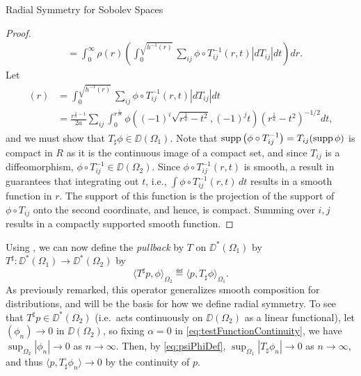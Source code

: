\begin{chapter}{Radial Symmetry for Sobolev Spaces}
\begin{proof}
\begin{align}
    &= \int_0^\infty \rho(r) \left(\int_0^{\sqrt{h^{-1}(r)}} \sum_{ij}\phi \circ T_{ij}^{-1}(r,t)\left|dT_{ij}\right|dt \right)dr \label{eq:phiEquation}.
  \end{align}
  Let 
  \begin{align}
    [T_\sharp\phi](r) 
      &= \int_0^{\sqrt{h^{-1}(r)}} \sum_{ij}\phi \circ T_{ij}^{-1}(r,t)\left|dT_{ij}\right|dt \\
      &= \frac{r^{\frac 1a -1} }{2a}\sum_{ij}\int_0^{r^{\frac{1}{2a}}} \phi \left((-1)^i\sqrt{r^{\frac 1a} - t^2}, (-1)^jt\right) \left( r^{\frac 1a} - t^2 \right)^{-1/2} dt, \label{eq:psiPhiDef}
  \end{align}
  and we must show that $T_\sharp\phi \in \DD(\Omega_1)$.
  Note that $\operatorname*{supp} \left(\phi \circ T_{ij}^{-1} \right) = T_{ij}( \operatorname*{supp} \phi )$ is compact in $R$ as it is the continuous image of a compact set, and since $T_{ij}$ is a diffeomorphism, $\phi \circ T_{ij}^{-1} \in \DD(\Omega_2)$. 
  Since $\phi\circ T_{ij}^{-1}(r,t)$ is smooth, a result in \cite[pg. 433]{strichartz2000} guarantees that integrating out $t$, i.e., $\int \phi \circ T_{ij}^{-1}(r,t)\,dt$ results in a smooth function in $r$.  
  The support of this function is the projection of the support of $\phi\circ T_{ij}$ onto the second coordinate, and hence, is compact.
  Summing over $i,j$ results in a compactly supported smooth function.

\end{proof}

Using , we can now define the \emph{pullback} by $T$ on $\DD^*(\Omega_1)$ by $T^\sharp:\DD^*(\Omega_1) \to \DD^*(\Omega_2)$ by
\begin{equation}
  \langle T^\sharp p, \phi \rangle_{\Omega_2} \eqdef \langle p, T_\sharp\phi\rangle_{\Omega_1}.
\end{equation}
As previously remarked, this operator generalizes smooth composition for distributions, and will be the basis for how we define radial symmetry.
To see that $T^\sharp p \in \DD^*(\Omega_2)$ (i.e.~acts continuously on $\DD(\Omega_2)$ as a linear functional), let $(\phi_n) \to 0$ in $\DD(\Omega_2)$, so fixing $\alpha = 0$ in \eqref{eq:testFunctionContinuity}, we have $\sup_{\Omega_2}|\phi_n| \to 0$ as $n\to\infty$. 
Then, by \eqref{eq:psiPhiDef}, $\sup_{\Omega_1} |T_\sharp\phi_n| \to 0$ as $n\to\infty$, and thus $\langle p, T_\sharp\phi_n\rangle \to 0$ by the continuity of $p$. 


\end{chapter}
